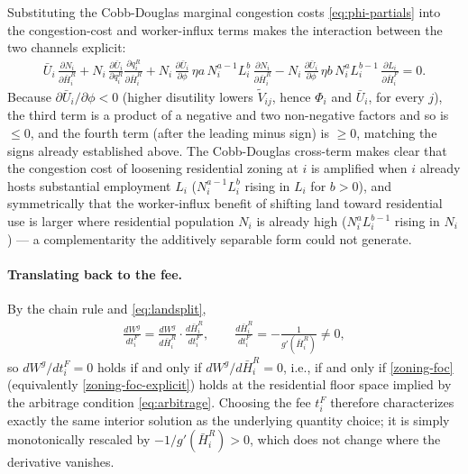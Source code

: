 \documentclass[12pt, a4paper]{article}
\theoremstyle{definition}
\begin{document}
Substituting the Cobb-Douglas marginal congestion costs \eqref{eq:phi-partials} into the congestion-cost and worker-influx terms makes the interaction between the two channels explicit:
\begin{align}
    \label{zoning-foc-explicit}
\bar{U}_i\,\frac{\partial N_i}{\partial \bar{H}_i^R}
+
N_i\,\frac{\partial \bar{U}_i}{\partial q_i^R}\frac{\partial q_i^R}{\partial \bar{H}_i^R}
+
N_i\,\frac{\partial \bar{U}_i}{\partial \phi}\,\eta a\, N_i^{a-1}L_i^{b}\,\frac{\partial N_i}{\partial \bar{H}_i^R}
-
N_i\,\frac{\partial \bar{U}_i}{\partial \phi}\,\eta b\, N_i^{a}L_i^{b-1}\,\frac{\partial L_i}{\partial \bar{H}_i^F}
= 0.
\end{align}
Because $\partial \bar U_i/\partial\phi < 0$ (higher disutility lowers $\tilde V_{ij}$, hence $\Phi_i$ and $\bar U_i$, for every $j$), the third term is a product of a negative and two non-negative factors and so is $\le 0$, and the fourth term (after the leading minus sign) is $\ge 0$, matching the signs already established above. The Cobb-Douglas cross-term makes clear that the congestion cost of loosening residential zoning at $i$ is amplified when $i$ already hosts substantial employment $L_i$ ($N_i^{a-1}L_i^b$ rising in $L_i$ for $b>0$), and symmetrically that the worker-influx benefit of shifting land toward residential use is larger where residential population $N_i$ is already high ($N_i^a L_i^{b-1}$ rising in $N_i$) — a complementarity the additively separable form could not generate.

\paragraph{Translating back to the fee.} By the chain rule and \eqref{eq:landsplit},
\begin{align}
    \label{zoning-foc-tax}
\frac{dW^g}{dt_i^F} = \frac{dW^g}{d\bar{H}_i^R}\cdot\frac{d\bar{H}_i^R}{dt_i^F}, \qquad
\frac{d\bar{H}_i^R}{dt_i^F} = -\frac{1}{g'(\bar{H}_i^R)} \neq 0,
\end{align}
so $dW^g/dt_i^F = 0$ holds if and only if $dW^g/d\bar{H}_i^R = 0$, i.e., if and only if \eqref{zoning-foc} (equivalently \eqref{zoning-foc-explicit}) holds at the residential floor space implied by the arbitrage condition \eqref{eq:arbitrage}. Choosing the fee $t_i^F$ therefore characterizes exactly the same interior solution as the underlying quantity choice; it is simply monotonically rescaled by $-1/g'(\bar{H}_i^R) > 0$, which does not change where the derivative vanishes.
\end{document}

